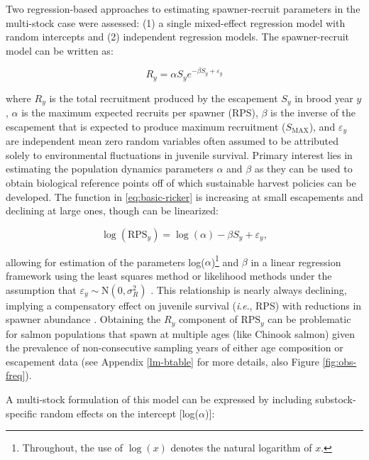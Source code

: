 \documentclass[12pt,]{book}
\let\rmarkdownfootnote\footnote%
\def\footnote{\protect\rmarkdownfootnote}
\theoremstyle{definition}
\theoremstyle{definition}
\theoremstyle{definition}
\theoremstyle{remark}
\begin{document}
\noindent
Two regression-based approaches to estimating \citet{ricker-1954}
spawner-recruit parameters in the multi-stock case were assessed: (1) a
single mixed-effect regression model with random intercepts and (2)
independent regression models. The \citet{ricker-1954} spawner-recruit
model can be written as:

\begin{equation}
  R_y=\alpha S_y e^{-\beta S_y + \varepsilon_y}
  \label{eq:basic-ricker}
\end{equation}

\noindent
where \(R_y\) is the total recruitment produced by the escapement
\(S_y\) in brood year \(y\), \(\alpha\) is the maximum expected recruits
per spawner (RPS), \(\beta\) is the inverse of the escapement that is
expected to produce maximum recruitment (\(S_{\text{MAX}}\)), and
\(\varepsilon_y\) are independent mean zero random variables often
assumed to be attributed solely to environmental fluctuations in
juvenile survival. Primary interest lies in estimating the population
dynamics parameters \(\alpha\) and \(\beta\) as they can be used to
obtain biological reference points off of which sustainable harvest
policies can be developed. The \citet{ricker-1954} function in
\eqref{eq:basic-ricker} is increasing at small escapements and declining
at large ones, though can be linearized:

\begin{equation}
  \log(\text{RPS}_y)=\log(\alpha)-\beta S_y + \varepsilon_y,
  \label{eq:lin-ricker-fixed}
\end{equation}

\noindent
allowing for estimation of the parameters log(\(\alpha\))\footnote{Throughout,
  the use of \(\log(x)\) denotes the natural logarithm of \(x\).} and
\(\beta\) in a linear regression framework using the least squares
method or likelihood methods under the assumption that
\(\varepsilon_y \sim \text{N}(0,\sigma^2_R)\)
\citep{clark-etal-2009, hilborn-walters-1992}. This relationship is
nearly always declining, implying a compensatory effect on juvenile
survival (\emph{i}.\emph{e}., RPS) with reductions in spawner abundance
\citep{rose-etal-2001}. Obtaining the \(R_y\) component of
\(\text{RPS}_{y}\) can be problematic for salmon populations that spawn
at multiple ages (like Chinook salmon) given the prevalence of
non-consecutive sampling years of either age composition or escapement
data (see Appendix \ref{lm-btable} for more details, also Figure
\ref{fig:obs-freq}).

A multi-stock formulation of this model can be expressed by including
substock-specific random effects on the intercept {[}log(\(\alpha\)){]}:
\end{document}

